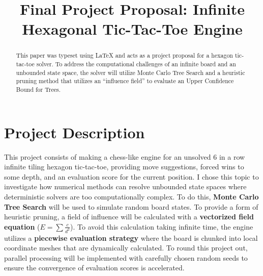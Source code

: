 \documentclass[conference]{IEEEtran}
\begin{document}
\title{Final Project Proposal: Infinite Hexagonal Tic-Tac-Toe Engine}

\author{
}

\maketitle

\begin{abstract}
This paper was typeset using \LaTeX{} and acts as a project proposal for a hexagon tic-tac-toe solver. To address the computational challenges of an infinite board and an unbounded state space, the solver will utilize Monte Carlo Tree Search and a heuristic pruning method that utilizes an ``influence field'' to evaluate an Upper Confidence Bound for Trees.
\end{abstract}

\section{Project Description}
This project consists of making a chess-like engine for an unsolved 6 in a row infinite tiling hexagon tic-tac-toe, providing move suggestions, forced wins to some depth, and an evaluation score for the current position. I chose this topic to investigate how numerical methods can resolve unbounded state spaces where deterministic solvers are too computationally complex. To do this, \textbf{Monte Carlo Tree Search} will be used to simulate random board states. To provide a form of heuristic pruning, a field of influence will be calculated with a \textbf{vectorized field equation} ($E = \sum \frac{c}{d^2}$). To avoid this calculation taking infinite time, the engine utilizes a \textbf{piecewise evaluation strategy} where the board is chunked into local coordinate meshes that are dynamically calculated. To round this project out, parallel processing will be implemented with carefully chosen random seeds to ensure the convergence of evaluation scores is accelerated.
\end{document}
